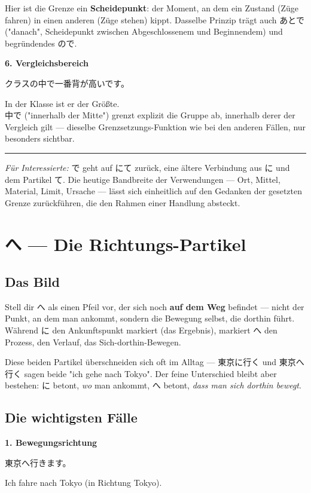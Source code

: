 \documentclass[12pt]{book}
\begin{document}
Hier ist die Grenze ein \textbf{Scheidepunkt}: der Moment, an dem ein Zustand (Züge fahren) in einen anderen (Züge stehen) kippt. Dasselbe Prinzip trägt auch あとで ("danach", Scheidepunkt zwischen Abgeschlossenem und Beginnendem) und begründendes ので.

\textbf{6. Vergleichsbereich}
\par\quad クラスの中で一番背が高いです。\\
\par\quad In der Klasse ist er der Größte.\\

中で ("innerhalb der Mitte") grenzt explizit die Gruppe ab, innerhalb derer der Vergleich gilt — dieselbe Grenzsetzungs-Funktion wie bei den anderen Fällen, nur besonders sichtbar.

\bigskip\hrule\bigskip

\emph{Für Interessierte:} で geht auf にて zurück, eine ältere Verbindung aus に und dem Partikel て. Die heutige Bandbreite der Verwendungen — Ort, Mittel, Material, Limit, Ursache — lässt sich einheitlich auf den Gedanken der gesetzten Grenze zurückführen, die den Rahmen einer Handlung absteckt.


\chapter{へ — Die Richtungs-Partikel}

\section*{Das Bild}

Stell dir へ als einen Pfeil vor, der sich noch \textbf{auf dem Weg} befindet — nicht der Punkt, an dem man ankommt, sondern die Bewegung selbst, die dorthin führt. Während に den Ankunftspunkt markiert (das Ergebnis), markiert へ den Prozess, den Verlauf, das Sich-dorthin-Bewegen.

Diese beiden Partikel überschneiden sich oft im Alltag — 東京に行く und 東京へ行く sagen beide "ich gehe nach Tokyo". Der feine Unterschied bleibt aber bestehen: に betont, \emph{wo} man ankommt, へ betont, \emph{dass man sich dorthin bewegt}.

\section*{Die wichtigsten Fälle}

\textbf{1. Bewegungsrichtung}
\par\quad 東京へ行きます。\\
\par\quad Ich fahre nach Tokyo (in Richtung Tokyo).\\
\end{document}
